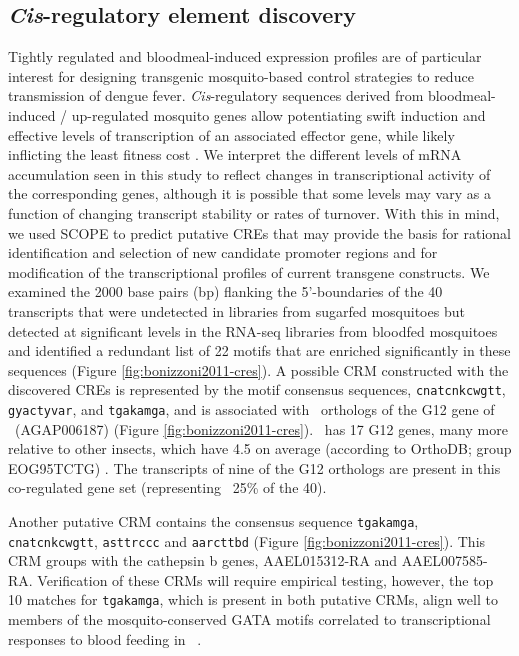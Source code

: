 \subsection{\textit{Cis}-regulatory element discovery}
Tightly regulated and bloodmeal-induced expression profiles are of particular interest for designing transgenic mosquito-based control strategies to reduce transmission of dengue fever. \textit{Cis}-regulatory sequences derived from bloodmeal-induced / up-regulated mosquito genes allow potentiating swift induction and effective levels of transcription of an associated effector gene, while likely inflicting the least fitness cost \cite{Marelli2006,Marelli2006}. We interpret the different levels of mRNA accumulation seen in this study to reflect changes in transcriptional activity of the corresponding genes, although it is possible that some levels may vary as a function of changing transcript stability or rates of turnover. With this in mind, we used \gls{SCOPE} \cite{Carlson2007} to predict putative \glspl{CRE} that may provide the basis for rational identification and selection of new candidate promoter regions and for modification of the transcriptional profiles of current transgene constructs. We examined the 2000 base pairs (bp) flanking the 5'-boundaries of the 40 transcripts that were undetected in libraries from sugarfed mosquitoes but detected at significant levels in the RNA-seq libraries from bloodfed mosquitoes and identified a redundant list of 22 motifs that are enriched significantly in these sequences (Figure \ref{fig:bonizzoni2011-cres}). A possible \gls{CRM} constructed with the discovered \glspl{CRE} is represented by the motif consensus sequences, \texttt{cnatcnkcwgtt}, \texttt{gyactyvar}, and \texttt{tgakamga}, and is associated with \Aa\  orthologs of the G12 gene of \Ag\ (AGAP006187) (Figure \ref{fig:bonizzoni2011-cres}). \Aa\ has 17 G12 genes, many more relative to other insects, which have 4.5 on average (according to OrthoDB; group EOG95TCTG) \cite{Kriventseva2008}. The transcripts of nine of the G12 orthologs are present in this co-regulated gene set (representing ~25\% of the 40).

Another putative \gls{CRM} contains the consensus sequence \texttt{tgakamga}, \texttt{cnatcnkcwgtt}, \texttt{asttrccc} and \texttt{aarcttbd} (Figure \ref{fig:bonizzoni2011-cres}). This \gls{CRM} groups with the cathepsin b genes, AAEL015312-RA and AAEL007585-RA. Verification of these \glspl{CRM} will require empirical testing, however, the top 10 matches for \texttt{tgakamga}, which is present in both putative \glspl{CRM}, align well to members of the mosquito-conserved GATA motifs correlated to transcriptional responses to blood feeding in \Ag\ \cite{Sieglaff2009}.





